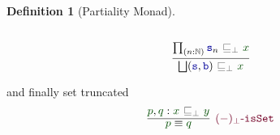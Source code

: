 \documentclass[twoside,11pt,openright]{report}
\theoremstyle{plain} %
\theoremstyle{definition}
\newtheorem{defn}[thm]{Definition}%
\theoremstyle{remark}
\newcommand*{\term}[1]{\textcolor{green!30!black}{#1}} %
\newcommand*{\relation}[1]{\textcolor{gray!75!black}{\ensuremath{\mathtt{#1}}}}
\newcommand*{\function}[1]{\textcolor{blue!60!black}{\ensuremath{\mathtt{#1}}}}
\newcommand*{\constructor}[1]{\textcolor{purple!60!black}{\ensuremath{\mathtt{#1}}}}
\begin{document}
\begin{defn}[Partiality Monad]
\begin{center}
\begin{minipage}{0.50\linewidth}
\begin{equation}
      \end{equation}
    \end{minipage}
    \hfill
    \begin{minipage}{0.3\linewidth}
      \begin{equation}
        \vcenter{\infer{\bigsqcup(\function{s},\function{b})~\relation{\sqsubseteq_{\bot}}~\term{x}}{\prod_{(n:\mathbb{N})} \function{s}_n~\relation{\sqsubseteq_{\bot}}~\term{x}}}
      \end{equation}
    \end{minipage}
  \end{center}
  and finally set truncated
  \begin{equation}
    \vcenter{\infer[\constructor{(-)_\bot\text{-}isSet}]{\term{p} \equiv \term{q}}{\term{p} , \term{q} : \term{x}~\relation{\sqsubseteq_{\bot}}~\term{y}}}
  \end{equation}
\end{defn}
\end{document}
